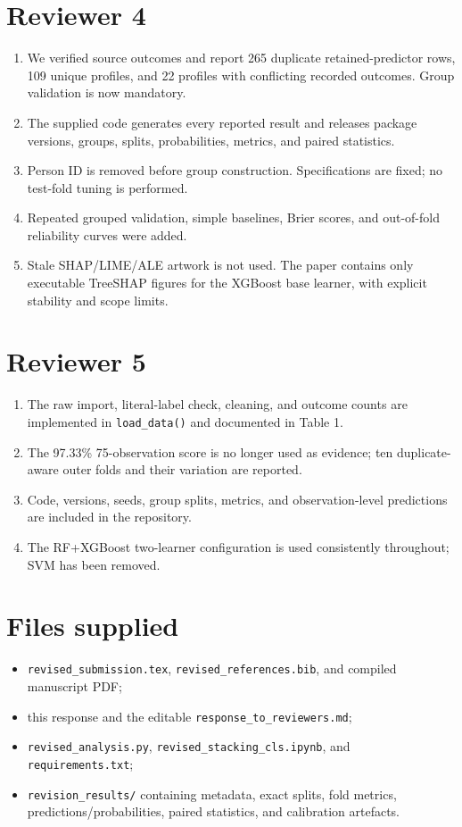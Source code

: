 \documentclass[11pt]{article}
\begin{document}
\section*{Reviewer 4}
\begin{enumerate}
\item We verified source outcomes and report 265 duplicate retained-predictor rows, 109 unique profiles, and 22 profiles with conflicting recorded outcomes. Group validation is now mandatory.
\item The supplied code generates every reported result and releases package versions, groups, splits, probabilities, metrics, and paired statistics.
\item Person ID is removed before group construction. Specifications are fixed; no test-fold tuning is performed.
\item Repeated grouped validation, simple baselines, Brier scores, and out-of-fold reliability curves were added.
\item Stale SHAP/LIME/ALE artwork is not used. The paper contains only executable TreeSHAP figures for the XGBoost base learner, with explicit stability and scope limits.
\end{enumerate}

\section*{Reviewer 5}
\begin{enumerate}
\item The raw import, literal-label check, cleaning, and outcome counts are implemented in \texttt{load\_data()} and documented in Table 1.
\item The 97.33\% 75-observation score is no longer used as evidence; ten duplicate-aware outer folds and their variation are reported.
\item Code, versions, seeds, group splits, metrics, and observation-level predictions are included in the repository.
\item The RF+XGBoost two-learner configuration is used consistently throughout; SVM has been removed.
\end{enumerate}

\section*{Files supplied}
\begin{itemize}
\item \texttt{revised\_submission.tex}, \texttt{revised\_references.bib}, and compiled manuscript PDF;
\item this response and the editable \texttt{response\_to\_reviewers.md};
\item \texttt{revised\_analysis.py}, \texttt{revised\_stacking\_cls.ipynb}, and \texttt{requirements.txt};
\item \texttt{revision\_results/} containing metadata, exact splits, fold metrics, predictions/probabilities, paired statistics, and calibration artefacts.
\end{itemize}
\end{document}
